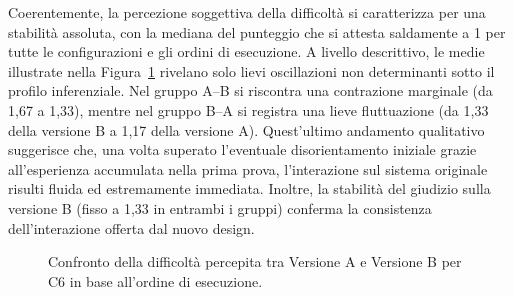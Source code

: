 Coerentemente, la percezione soggettiva della difficoltà si caratterizza per una stabilità assoluta, con la mediana del punteggio che si attesta saldamente a 1 per tutte le configurazioni e gli ordini di esecuzione. A livello descrittivo, le medie illustrate nella Figura~\ref{fig:6-c6-2} rivelano solo lievi oscillazioni non determinanti sotto il profilo inferenziale. Nel gruppo A--B si riscontra una contrazione marginale (da 1,67 a 1,33), mentre nel gruppo B--A si registra una lieve fluttuazione (da 1,33 della versione B a 1,17 della versione A). Quest'ultimo andamento qualitativo suggerisce che, una volta superato l'eventuale disorientamento iniziale grazie all'esperienza accumulata nella prima prova, l'interazione sul sistema originale risulti fluida ed estremamente immediata. Inoltre, la stabilità del giudizio sulla versione B (fisso a 1,33 in entrambi i gruppi) conferma la consistenza dell'interazione offerta dal nuovo design.

\begin{figure}[H]
	\centering
	\caption{Confronto della difficoltà percepita tra Versione A e Versione B per C6 in base all'ordine di esecuzione.}
	\label{fig:6-c6-2}
\end{figure}
